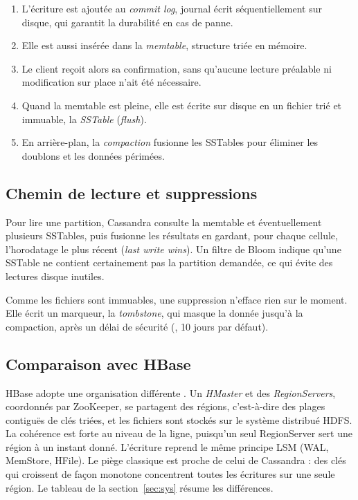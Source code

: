 \documentclass[11pt,a4paper]{article}
\newcommand{\cq}[1]{\texttt{\detokenize{#1}}}
\begin{document}
\begin{enumerate}
  \item L'écriture est ajoutée au \emph{commit log}, journal écrit séquentiellement sur disque, qui garantit la durabilité en cas de panne.
  \item Elle est aussi insérée dans la \emph{memtable}, structure triée en mémoire.
  \item Le client reçoit alors sa confirmation, sans qu'aucune lecture préalable ni modification sur place n'ait été nécessaire.
  \item Quand la memtable est pleine, elle est écrite sur disque en un fichier trié et immuable, la \emph{SSTable} (\emph{flush}).
  \item En arrière-plan, la \emph{compaction} fusionne les SSTables pour éliminer les doublons et les données périmées.
\end{enumerate}

\subsection{Chemin de lecture et suppressions}
Pour lire une partition, Cassandra consulte la memtable et éventuellement plusieurs SSTables, puis fusionne les résultats en gardant, pour chaque cellule, l'horodatage le plus récent (\emph{last write wins}). Un filtre de Bloom indique qu'une SSTable ne contient certainement pas la partition demandée, ce qui évite des lectures disque inutiles.

Comme les fichiers sont immuables, une suppression n'efface rien sur le moment. Elle écrit un marqueur, la \emph{tombstone}, qui masque la donnée jusqu'à la compaction, après un délai de sécurité (\cq{gc_grace_seconds}, 10 jours par défaut).

\subsection{Comparaison avec HBase}
HBase adopte une organisation différente \cite{hbase}. Un \emph{HMaster} et des \emph{RegionServers}, coordonnés par ZooKeeper, se partagent des régions, c'est-à-dire des plages contiguës de clés triées, et les fichiers sont stockés sur le système distribué HDFS. La cohérence est forte au niveau de la ligne, puisqu'un seul RegionServer sert une région à un instant donné. L'écriture reprend le même principe LSM (WAL, MemStore, HFile). Le piège classique est proche de celui de Cassandra : des clés qui croissent de façon monotone concentrent toutes les écritures sur une seule région. Le tableau de la section~\ref{sec:sys} résume les différences.
\end{document}
